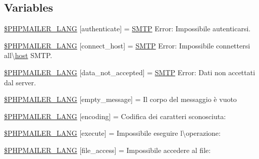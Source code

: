 \subsection*{Variables}
\begin{DoxyCompactItemize}
\item 
\hyperlink{phpmailer_8lang-it_8php_a2cb33073c989b85580748e331ed8b4aa}{\$\+P\+H\+P\+M\+A\+I\+L\+E\+R\+\_\+\+L\+A\+NG} \mbox{[}\textquotesingle{}authenticate\textquotesingle{}\mbox{]} = \textquotesingle{}\hyperlink{class_s_m_t_p}{S\+M\+TP} Error\+: Impossibile autenticarsi.\textquotesingle{}
\item 
\hyperlink{phpmailer_8lang-it_8php_a2ee0cc637a06b96e45600db31c6799ee}{\$\+P\+H\+P\+M\+A\+I\+L\+E\+R\+\_\+\+L\+A\+NG} \mbox{[}\textquotesingle{}connect\+\_\+host\textquotesingle{}\mbox{]} = \textquotesingle{}\hyperlink{class_s_m_t_p}{S\+M\+TP} Error\+: Impossibile connettersi all\textbackslash{}\textquotesingle{}\hyperlink{ossn_8config_8db_8example_8php_a5bc8babfba069f855b3288f34a926b5a}{host} S\+M\+T\+P.\textquotesingle{}
\item 
\hyperlink{phpmailer_8lang-it_8php_a814c6b191205d2361b3233e9c9d6fda5}{\$\+P\+H\+P\+M\+A\+I\+L\+E\+R\+\_\+\+L\+A\+NG} \mbox{[}\textquotesingle{}data\+\_\+not\+\_\+accepted\textquotesingle{}\mbox{]} = \textquotesingle{}\hyperlink{class_s_m_t_p}{S\+M\+TP} Error\+: Dati non accettati dal server.\textquotesingle{}
\item 
\hyperlink{phpmailer_8lang-it_8php_a33772099f637c9d6c2cd7425e0e37fed}{\$\+P\+H\+P\+M\+A\+I\+L\+E\+R\+\_\+\+L\+A\+NG} \mbox{[}\textquotesingle{}empty\+\_\+message\textquotesingle{}\mbox{]} = \textquotesingle{}Il corpo del messaggio è vuoto\textquotesingle{}
\item 
\hyperlink{phpmailer_8lang-it_8php_a817f7283f3d54c970a0c10305cc668cc}{\$\+P\+H\+P\+M\+A\+I\+L\+E\+R\+\_\+\+L\+A\+NG} \mbox{[}\textquotesingle{}encoding\textquotesingle{}\mbox{]} = \textquotesingle{}Codifica dei caratteri sconosciuta\+: \textquotesingle{}
\item 
\hyperlink{phpmailer_8lang-it_8php_a668217a9563a168f30f2a8548b6ed5a9}{\$\+P\+H\+P\+M\+A\+I\+L\+E\+R\+\_\+\+L\+A\+NG} \mbox{[}\textquotesingle{}execute\textquotesingle{}\mbox{]} = \textquotesingle{}Impossibile eseguire l\textbackslash{}\textquotesingle{}operazione\+: \textquotesingle{}
\item 
\hyperlink{phpmailer_8lang-it_8php_a7e83349023b856ef9e5c46e30ae6d51e}{\$\+P\+H\+P\+M\+A\+I\+L\+E\+R\+\_\+\+L\+A\+NG} \mbox{[}\textquotesingle{}file\+\_\+access\textquotesingle{}\mbox{]} = \textquotesingle{}Impossibile accedere al file\+: \textquotesingle{}

\end{DoxyCompactItemize}
